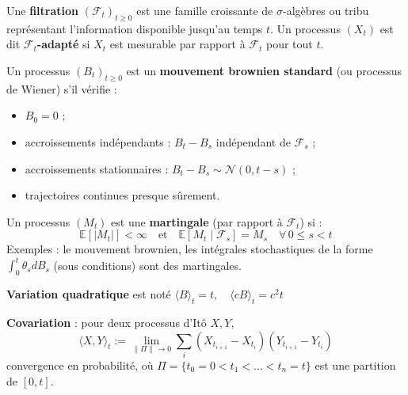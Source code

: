 \begin{f}
	
Une \textbf{filtration} $(\mathcal{F}_t)_{t \geq 0}$ est une famille croissante de $\sigma$-algèbres ou tribu représentant l’information disponible jusqu’au temps $t$. Un processus $(X_t)$ est dit \textbf{$\mathcal{F}_t$-adapté} si $X_t$ est mesurable par rapport à $\mathcal{F}_t$ pour tout $t$.
	
Un processus $(B_t)_{t \geq 0}$ est un \textbf{mouvement brownien standard} (ou processus de Wiener) s’il vérifie :
	\begin{itemize} 
		\item $B_0 = 0$ ;
		\item accroissements indépendants : $B_t - B_s$  indépendant de $\mathcal{F}_s$ ;
		\item accroissements stationnaires : $B_t - B_s \sim \mathcal{N}(0, t - s)$ ;
		\item trajectoires continues presque sûrement.
	\end{itemize}
	
	Un processus $(M_t)$ est une \textbf{martingale} (par rapport à $\mathcal{F}_t$) si :
	\[
	\mathbb{E}[|M_t|] < \infty \quad \text{et} \quad \mathbb{E}[M_t \mid \mathcal{F}_s] = M_s \quad \forall\, 0 \leq s < t
	\]
	Exemples : le mouvement brownien, les intégrales stochastiques de la forme $\int_0^t \theta_s dB_s$ (sous conditions) sont des martingales.
	\medskip
	
	\textbf{Variation quadratique} est noté $
	\langle B \rangle_t = t, \quad \langle cB \rangle_t = c^2 t$
	
\textbf{Covariation} : pour deux processus d’Itô $X, Y$,
\[
\langle X, Y \rangle_t := \lim_{\|\Pi\| \to 0} \sum_{i} (X_{t_{i+1}} - X_{t_i})(Y_{t_{i+1}} - Y_{t_i})
\]
convergence en probabilité, où $\Pi = \{t_0 = 0 < t_1 < \dots < t_n = t\}$ est une partition de $[0,t]$.
\end{f}


